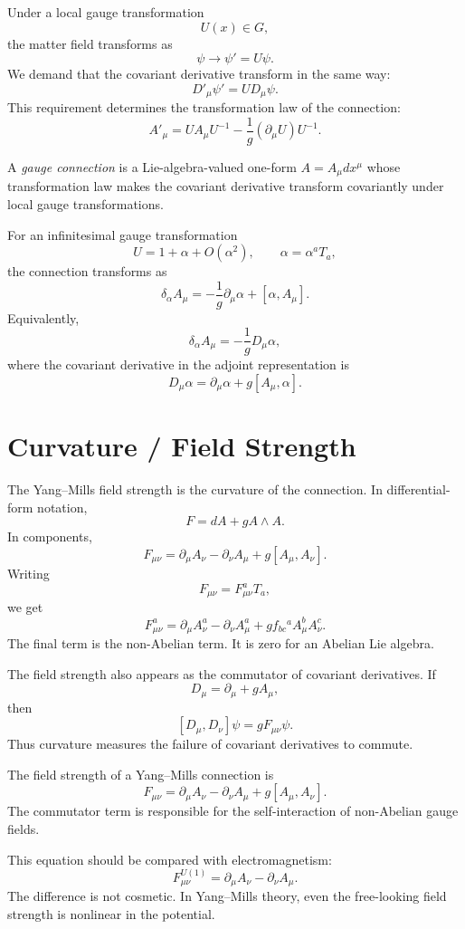 Under a local gauge transformation
\[
    U(x)\in G,
\]
the matter field transforms as
\[
    \psi\longrightarrow \psi'=U\psi.
\]
We demand that the covariant derivative transform in the same way:
\[
    D'_\mu\psi'=U D_\mu\psi.
\]
This requirement determines the transformation law of the connection:
\[
    A'_\mu=U A_\mu U^{-1}-\frac{1}{g}(\partial_\mu U)U^{-1}.
\]

\begin{definitionbox}
A \emph{gauge connection} is a Lie-algebra-valued one-form \(A=A_\mu dx^\mu\)
whose transformation law makes the covariant derivative transform covariantly
under local gauge transformations.
\end{definitionbox}

For an infinitesimal gauge transformation
\[
    U=1+\alpha+O(\alpha^2),
    \qquad
    \alpha=\alpha^aT_a,
\]
the connection transforms as
\[
    \delta_\alpha A_\mu=-\frac{1}{g}\partial_\mu\alpha+[\alpha,A_\mu].
\]
Equivalently,
\[
    \delta_\alpha A_\mu=-\frac{1}{g}D_\mu\alpha,
\]
where the covariant derivative in the adjoint representation is
\[
    D_\mu\alpha=\partial_\mu\alpha+g[A_\mu,\alpha].
\]

\section{Curvature / Field Strength}

The Yang--Mills field strength is the curvature of the connection. In
differential-form notation,
\[
    F=dA+gA\wedge A.
\]
In components,
\[
    F_{\mu\nu}=\partial_\mu A_\nu-\partial_\nu A_\mu+g[A_\mu,A_\nu].
\]
Writing
\[
    F_{\mu\nu}=F_{\mu\nu}^aT_a,
\]
we get
\[
    F_{\mu\nu}^a
    =\partial_\mu A_\nu^a-\partial_\nu A_\mu^a
     +g f_{bc}{}^a A_\mu^b A_\nu^c.
\]
The final term is the non-Abelian term. It is zero for an Abelian Lie algebra.

The field strength also appears as the commutator of covariant derivatives. If
\[
    D_\mu=\partial_\mu+gA_\mu,
\]
then
\[
    [D_\mu,D_\nu]\psi=gF_{\mu\nu}\psi.
\]
Thus curvature measures the failure of covariant derivatives to commute.

\begin{theorembox}
The field strength of a Yang--Mills connection is
\[
    F_{\mu\nu}=\partial_\mu A_\nu-\partial_\nu A_\mu+g[A_\mu,A_\nu].
\]
The commutator term is responsible for the self-interaction of non-Abelian gauge
fields.
\end{theorembox}

This equation should be compared with electromagnetism:
\[
    F_{\mu\nu}^{U(1)}=\partial_\mu A_\nu-\partial_\nu A_\mu.
\]
The difference is not cosmetic. In Yang--Mills theory, even the free-looking
field strength is nonlinear in the potential.

